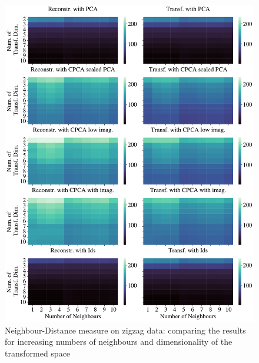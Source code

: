 \documentclass[pdftex,12pt,a4paper]{report}
\begin{document}
\begin{figure}
    \includegraphics[width = \textwidth]{images/multiple_runs/cpca/zigzag/num_neigh_vs_dyn_low/euclidean_10runs_5lines_100points_10neighbours.pdf}
    \caption{Neighbour-Distance measure on zigzag data: comparing the results
     for increasing numbers of neighbours and dimensionality of the transformed space} \label{fig:cpca-num_neigh_vs_dyn_low-zigzag-euclidean}
\end{figure}
\end{document}
